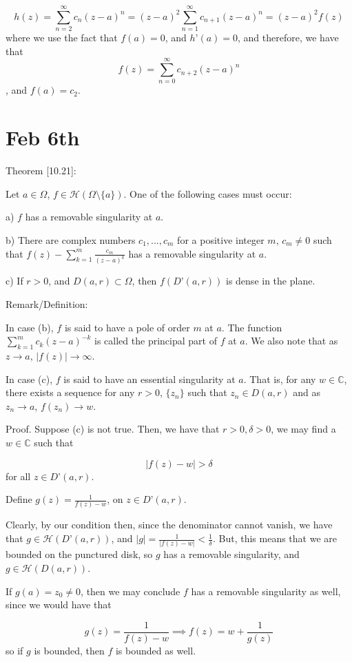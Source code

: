 \documentclass[10pt]{article}
\newcommand{\calH}{\mathcal{H}}
\begin{document}
$$h(z) = \sum_{n=2}^\infty c_n(z-a)^n = (z-a)^2 \sum_{n=1}^\infty c_{n+1} (z-a)^n = (z-a)^2 f(z)$$ where we use the fact that $f(a) = 0$, and $h’(a) = 0$, and therefore, we have that $$ f(z) = \sum_{n=0}^\infty c_{n+2} (z-a)^n$$, and $f(a) = c_2$.

\section*{Feb 6th}

Theorem [10.21]:

Let $a \in \Omega$, $f \in \calH(\Omega \setminus \{ a \})$. One of the following cases must occur:

a) $f$ has a removable singularity at $a$.

b) There are complex numbers $c_1,...,c_m$ for a positive integer $m$, $c_m \not = 0$ such that $f(z) - \sum_{k=1}^m \frac{c_m}{(z-a)^k}$ has a removable singularity at $a$.

c) If $r > 0$, and $D(a,r) \subset \Omega$, then $f(D’(a,r))$ is dense in the plane.

Remark/Definition: 

In case (b), $f$ is said to have a pole of order $m$ at $a$. The function $\sum_{k=1}^m c_k (z - a)^{-k}$ is called the principal part of $f$ at $a$. We also note that as $z \to a$, $| f(z) | \to \infty$.

In case (c), $f$ is said to have an essential singularity at $a$. That is, for any $w \in \mathbb{C}$, there exists a sequence for any $r > 0$, $\{ z_n \}$ such that $z_n \in D(a,r)$ and as $z_n \to a$, $f( z_n) \to w$. 

Proof. Suppose (c) is not true. Then, we have that $r > 0, \delta > 0$, we may find a $w \in \mathbb{C}$ such that

$$ | f(z)  - w | > \delta$$ for all $z \in D’(a,r)$.

Define $g(z) = \frac{1}{f(z) - w}$, on $z \in D’(a,r)$.

Clearly, by our condition then, since the denominator cannot vanish, we have that $g \in \calH(D’(a,r))$, and $|g| =  \frac{1}{|f(z) - w|} < \frac{1}{\delta}$. But, this means that we are bounded on the punctured disk, so $g$ has a removable singularity, and $g \in \calH(D(a,r))$.

If $g(a) = z_0 \not = 0$, then we may conclude $f$ has a removable singularity as well, since we would have that

$$ g(z) = \frac{1}{f(z) - w} \implies f(z) = w + \frac{1}{g(z)}$$ so if $g$ is bounded, then $f$ is bounded as well.
\end{document}

